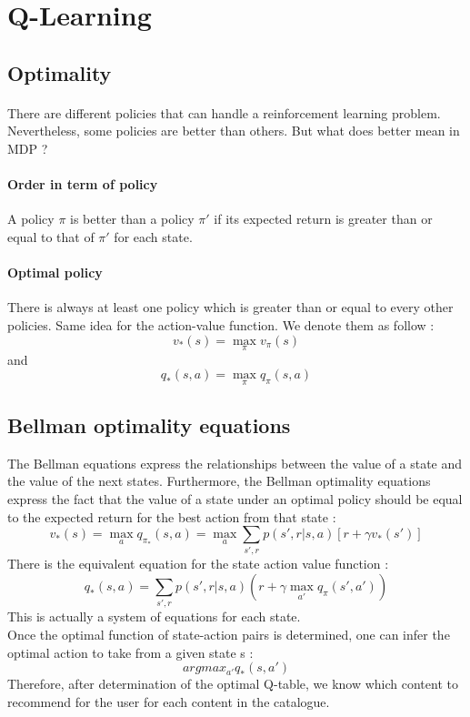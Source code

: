 \documentclass[a4paper]{article}
\begin{document}
\section{Q-Learning}

\subsection{Optimality}

\paragraph{} There are different policies that can handle a reinforcement learning problem. Nevertheless, some policies are better than others. But what does better mean in MDP ? 
\paragraph{Order in term of policy} A policy $\pi$ is better than a policy $\pi'$ if its expected return is greater than or equal to that of $\pi'$ for each state.
\paragraph{Optimal policy} There is always at least one policy which is greater than or equal to every other policies. Same idea for the action-value function. We denote them as follow : 
\[    v_{*}(s) = \max_{\pi} v_{\pi}(s)          \] and 
\[    q_{*}(s,a) = \max_{\pi} q_{\pi}(s,a)          \] 


\subsection{Bellman optimality equations}

The Bellman equations express the relationships between the value of a state and the value of the next states. 
Furthermore, the Bellman optimality equations express the fact that the value of a state under an optimal policy should be equal to the expected return for the best action from that state : 
\[  v_{*}(s)  = \max_{a} q_{\pi_{*}}(s,a)   = \max_{a} \sum_{s',r} p(s',r | s,a) [r + \gamma v_{*}(s')]                \]
There is the equivalent equation for the state action value function : 
\[  q_{*}(s,a) = \sum_{s', r} p(s',r |s,a) (r + \gamma \max_{a'} q_{\pi}(s',a')    )        \]
This is actually a system of equations for each state. \\
Once the optimal function of state-action pairs is determined, one can infer the optimal action to take from a given state s  : 
\[   argmax_{a'} q_{*}(s,a')                \]
Therefore, after determination of the optimal Q-table, we know which content to recommend for the user for each content in the catalogue.
\end{document}
